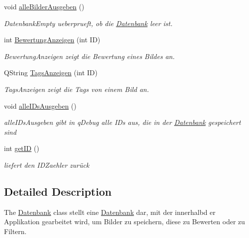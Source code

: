 \begin{DoxyCompactItemize}
void \hyperlink{class_datenbank_a3c19e7a257dc6527cc9492578e04458d}{alle\+Bilder\+Ausgeben} ()
\begin{DoxyCompactList}\small\item\em Datenbank\+Empty ueberprueft, ob die \hyperlink{class_datenbank}{Datenbank} leer ist. \end{DoxyCompactList}\item 
int \hyperlink{class_datenbank_afa15c63d30ec754b12621a35acc9bc48}{Bewertung\+Anzeigen} (int ID)
\begin{DoxyCompactList}\small\item\em Bewertung\+Anzeigen zeigt die Bewertung eines Bildes an. \end{DoxyCompactList}\item 
Q\+String \hyperlink{class_datenbank_a1fa37141427e410e36b87636e12c68ba}{Tags\+Anzeigen} (int ID)
\begin{DoxyCompactList}\small\item\em Tags\+Anzeigen zeigt die Tags von einem Bild an. \end{DoxyCompactList}\item 
void \hyperlink{class_datenbank_a3f5897a282e10debb02dbab8ccd2641a}{alle\+I\+Ds\+Ausgeben} ()\hypertarget{class_datenbank_a3f5897a282e10debb02dbab8ccd2641a}{}\label{class_datenbank_a3f5897a282e10debb02dbab8ccd2641a}

\begin{DoxyCompactList}\small\item\em alle\+I\+Ds\+Ausgeben gibt in q\+Debug alle I\+Ds aus, die in der \hyperlink{class_datenbank}{Datenbank} gespeichert sind \end{DoxyCompactList}\item 
int \hyperlink{class_datenbank_abc0b108d061a5700b9d305bc2c29cc8d}{get\+ID} ()
\begin{DoxyCompactList}\small\item\em liefert den I\+D\+Zaehler zurück \end{DoxyCompactList}\end{DoxyCompactItemize}


\subsection{Detailed Description}
The \hyperlink{class_datenbank}{Datenbank} class stellt eine \hyperlink{class_datenbank}{Datenbank} dar, mit der innerhalbd er Applikation gearbeitet wird, um Bilder zu speichern, diese zu Bewerten oder zu Filtern. 

